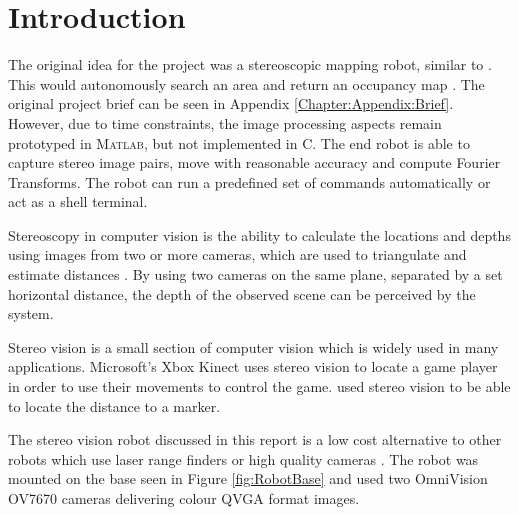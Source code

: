\chapter{Introduction} \label{Chapter:Introduction}

%
%
%
%



The original idea for the project was a stereoscopic mapping robot, similar to \cite{Pirobot}. This would autonomously search an area and return an occupancy map \citep{thrun2003learning}. The original project brief can be seen in Appendix \ref{Chapter:Appendix:Brief}. However, due to time constraints, the image processing aspects remain prototyped in \textsc{Matlab}, but not implemented in C. The end robot is able to capture stereo image pairs, move with reasonable accuracy and compute Fourier Transforms. The robot can run a predefined set of commands automatically or act as a shell terminal.

Stereoscopy in computer vision is the ability to calculate the locations and depths using images from two or more cameras, which are used to triangulate and estimate distances \citep{Saxena:DepthEstimation}. By using two cameras on the same plane, separated by a set horizontal distance, the depth of the observed scene can be perceived by the system.

Stereo vision is a small section of computer vision which is widely used in many applications. Microsoft's Xbox Kinect \citep{Microsoft:Kinect} uses stereo vision to locate a game player in order to use their movements to control the game. \cite{Mrovlje:Distance_Stereoscopic} used stereo vision to be able to locate the distance to a marker. 

The stereo vision robot discussed in this report is a low cost alternative to other robots which use laser range finders or high quality cameras \citep{Se:MappingRobot}. The robot was mounted on the base seen in Figure \ref{fig:RobotBase} and used two OmniVision OV7670 cameras delivering colour QVGA format images.

